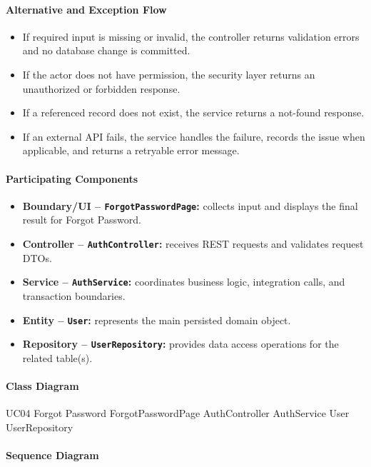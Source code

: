 \paragraph{Alternative and Exception Flow}

\begin{itemize}
    \item If required input is missing or invalid, the controller returns validation errors and no database change is committed.
    \item If the actor does not have permission, the security layer returns an unauthorized or forbidden response.
    \item If a referenced record does not exist, the service returns a not-found response.
    \item If an external API fails, the service handles the failure, records the issue when applicable, and returns a retryable error message.
\end{itemize}

\paragraph{Participating Components}

\begin{itemize}
    \item \textbf{Boundary/UI -- \texttt{ForgotPasswordPage}:} collects input and displays the final result for Forgot Password.
    \item \textbf{Controller -- \texttt{AuthController}:} receives REST requests and validates request DTOs.
    \item \textbf{Service -- \texttt{AuthService}:} coordinates business logic, integration calls, and transaction boundaries.
    \item \textbf{Entity -- \texttt{User}:} represents the main persisted domain object.
    \item \textbf{Repository -- \texttt{UserRepository}:} provides data access operations for the related table(s).
\end{itemize}

\paragraph{Class Diagram}

\ClassDiagram
{UC04 Forgot Password}
{ForgotPasswordPage}
{AuthController}
{AuthService}
{User}
{UserRepository}

\paragraph{Sequence Diagram}

